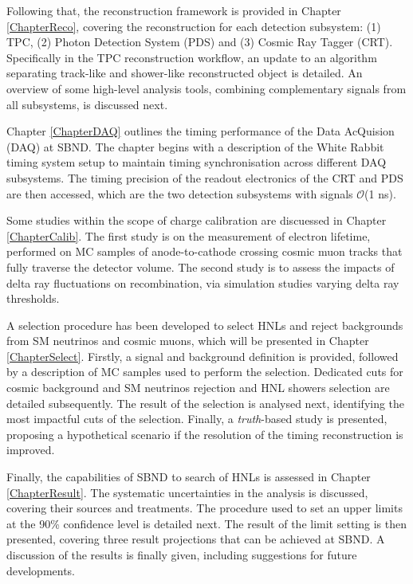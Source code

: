 Following that, the reconstruction framework is provided in Chapter \ref{ChapterReco}, covering the reconstruction for each detection subsystem: (1) TPC, (2) Photon Detection System (PDS) and (3) Cosmic Ray Tagger (CRT).
Specifically in the TPC reconstruction workflow, an update to an algorithm separating track-like and shower-like reconstructed object is detailed.
An overview of some high-level analysis tools, combining complementary signals from all subsystems, is discussed next. 

Chapter \ref{ChapterDAQ} outlines the timing performance of the Data AcQuision (DAQ) at SBND.
The chapter begins with a description of the White Rabbit timing system setup to maintain timing synchronisation across different DAQ subsystems.
The timing precision of the readout electronics of the CRT and PDS are then accessed, which are the two detection subsystems with signals $\mathcal{O}$(1 ns).

Some studies within the scope of charge calibration are discuessed in Chapter \ref{ChapterCalib}.
The first study is on the measurement of electron lifetime, performed on MC samples of anode-to-cathode crossing cosmic muon tracks that fully traverse the detector volume.
The second study is to assess the impacts of delta ray fluctuations on recombination, via simulation studies varying delta ray thresholds.  

A selection procedure has been developed to select HNLs and reject backgrounds from SM neutrinos and cosmic muons, which will be presented in Chapter \ref{ChapterSelect}.
Firstly, a signal and background definition is provided, followed by a description of MC samples used to perform the selection.
Dedicated cuts for cosmic background and SM neutrinos rejection and HNL showers selection are detailed subsequently.
The result of the selection is analysed next, identifying the most impactful cuts of the selection.
Finally, a \textit{truth}-based study is presented, proposing a hypothetical scenario if the resolution of the timing reconstruction is improved.    

Finally, the capabilities of SBND to search of HNLs is assessed in Chapter \ref{ChapterResult}.
The systematic uncertainties in the analysis is discussed, covering their sources and treatments.
The procedure used to set an upper limits at the 90\% confidence level is detailed next. 
The result of the limit setting is then presented, covering three result projections that can be achieved at SBND.  
A discussion of the results is finally given, including suggestions for future developments.
